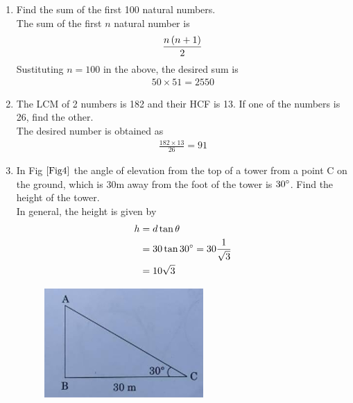 \documentclass[journal,12pt,twocolumn]{IEEEtran}
\begin{document}
\begin{enumerate}[label=2.\arabic*]
\item Find the sum of the first 100 natural numbers.\\
	\solution The sum of the first $n$ natural number is 
  \begin{align}
	  \frac{n\left(n+1\right)}{2}
  \end{align}
Sustituting $n = 100$ in the above, the desired sum is 
  \begin{align}
50 \times 51 = 2550	
  \end{align}
\item The LCM of 2 numbers is 182 and their HCF is 13. If one of the numbers is 26, find the other.\\
\solution The desired number is obtained as
  \begin{align}
	  \frac{182 \times 13}{26} = 91
  \end{align}
\item In Fig $\ref{Fig4}$ the angle of elevation from the top of a tower from a point C on the ground, which is 30m away from the foot of the tower is $30\degree$. Find the height of the tower.\\
	\solution In general, the height is given by 
  \begin{align}
	  h &= d \tan \theta
	  \\
	  &= 30 \tan 30 \degree = 30 \frac{1}{\sqrt{3}}
	  \\
	  &= 10 \sqrt{3}
  \end{align}

\begin{figure}[h!]
    \centering
    \includegraphics[width=0.5\columnwidth]{Fig4.png}
	\caption{}
	\label{Fig4}
 \end{figure}
\end{enumerate}
\end{document}
